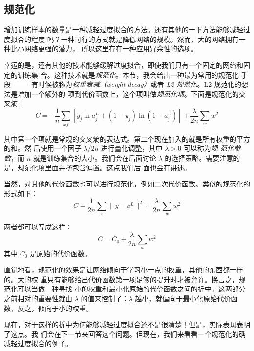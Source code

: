 \subsection{规范化}

增加训练样本的数量是一种减轻过度拟合的方法。还有其他的一下方法能够减轻过度拟合的程度
吗？一种可行的方式就是降低网络的规模。然而，大的网络拥有一种比小网络更强的潜力，
所以这里存在一种应用冗余性的选项。

幸运的是，还有其他的技术能够缓解过度拟合，即使我们只有一个固定的网络和固定的训练集
合。这种技术就是\emph{规范化}。本节，我会给出一种最为常用的规范化
手段~——~有时候被称为\emph{权重衰减（weight decay）}或者 \emph{L2 规范化}。L2 规范化的想法是增加一个额外的
项到代价函数上，这个项叫做\emph{规范化项}。下面是规范化的交叉熵：
\begin{equation}
  C = -\frac{1}{n} \sum_{xj} \left[ y_j \ln a^L_j+(1-y_j) \ln
  (1-a^L_j)\right] + \frac{\lambda}{2n} \sum_w w^2
\label{eq:85}\tag{85}
\end{equation}

其中第一个项就是常规的交叉熵的表达式。第二个现在加入的就是所有权重的平方的和。然
后使用一个因子 $\lambda / 2n$ 进行量化调整，其中 $\lambda > 0$ 可以称为\emph{规
  范化参数}，而 $n$ 就是训练集合的大小。我们会在后面讨论
$\lambda$ 的选择策略。需要注意的是，规范化项里面并\emph{不}包含偏置。这点我们后
面也会在讲述。

当然，对其他的代价函数也可以进行规范化，例如二次代价函数。类似的规范化的形式如下：
\begin{equation}
  C = \frac{1}{2n} \sum_x \|y-a^L\|^2 + \frac{\lambda}{2n} \sum_w w^2
  \label{eq:86}\tag{86}
\end{equation}

两者都可以写成这样：
\begin{equation}
  C = C_0 + \frac{\lambda}{2n} \sum_w w^2
  \label{eq:87}\tag{87}
\end{equation}
其中 $C_0$ 是原始的代价函数。

直觉地看，规范化的效果是让网络倾向于学习小一点的权重，其他的东西都一样的。大的权
重只有能够给出代价函数第一项足够的提升时才被允许。换言之，规范化可以当做一种寻找
小的权重和最小化原始的代价函数之间的折中。这两部分之前相对的重要性就由 $\lambda$
的值来控制了：$\lambda$ 越小，就偏向于最小化原始代价函数，反之，倾向于小的权重。

现在，对于这样的折中为何能够减轻过度拟合还不是很清楚！但是，实际表现表明了这点。我
们会在下一节来回答这个问题。但现在，我们来看看一个规范化的确减轻过度拟合的例子。

